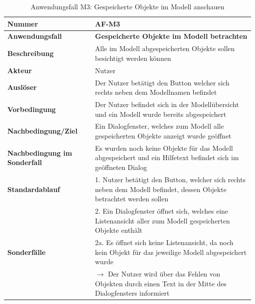 \documentclass[oneside]{ausarbeitung}
\begin{document}
\begin{table}[htbp]
	\centering
	\begin{tabular}{|l|p{80mm}|}
		\hline
		\textbf{Nummer} & \textbf{AF-M3} \\ \hline
		\textbf{Anwendungsfall} & \textbf{Gespeicherte Objekte im Modell betrachten} \\ \hline
		\textbf{Beschreibung} & Alle im Modell abgespeicherten Objekte sollen besichtigt werden können \\ \hline
		\textbf{Akteur} & Nutzer \\ \hline
		\textbf{Auslöser} & Der Nutzer betätigt den Button welcher sich rechts neben dem Modellnamen befindet  \\ \hline
		\textbf{Vorbedingung} & Der Nutzer befindet sich in der Modellübersicht und ein Modell wurde bereits abgespeichert \\ \hline	
		\textbf{Nachbedingung/Ziel} & Ein Dialogfenster, welches zum Modell alle gespeicherten Objekte anzeigt wurde geöffnet \\ \hline
		\textbf{Nachbedingung im Sonderfall} & Es wurden noch keine Objekte für das Modell abgespeichert und ein Hilfetext befindet sich im geöffneten Dialog \\ \hline
		\textbf{Standardablauf} & 1. Nutzer betätigt den Button, welcher sich rechts neben dem Modell befindet, dessen Objekte betrachtet werden sollen \\
		& 2. Ein Dialogfenster öffnet sich, welches eine Listenansicht aller zum Modell gespeicherten Objekte enthält \\ \hline
		\textbf{Sonderfälle} & 2a. Es öffnet sich keine Listenansicht, da noch kein Objekt für das jeweilige Modell abgespeichert wurde \\ & $\rightarrow$ Der Nutzer wird über das Fehlen von Objekten durch einen Text in der Mitte des Dialogfensters informiert \\ \hline
		
	\end{tabular}
	\caption{Anwendungsfall M3: Gespeicherte Objekte im Modell anschauen}
	\label{tab:use-case-view-saved-objects}
\end{table}
\end{document}
